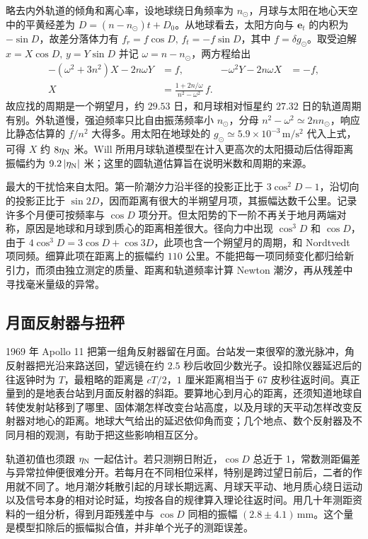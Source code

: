 略去内外轨道的倾角和离心率，设地球绕日角频率为 $n_\odot$，月球与太阳在地心天空中的平黄经差为 $D=(n-n_\odot)t+D_0$。从地球看去，太阳方向与 $\bm e_t$ 的内积为 $-\sin D$，故差分落体力有 $f_r=f\cos D,\,f_t=-f\sin D$，其中 $f=\delta g_\odot$。取受迫解 $x=X\cos D,\,y=Y\sin D$ 并记 $\omega=n-n_\odot$，两方程给出
\begin{align*}
    - (\omega^2+3n^2)X-2n\omega Y&=f,&
    -\omega^2Y-2n\omega X&=-f,\\
    X&=\frac{1+2n/\omega}{n^2-\omega^2}\,f .
\end{align*}
故应找的周期是一个朔望月，约 $29.53$ 日，和月球相对恒星约 $27.32$ 日的轨道周期有别。外轨道慢，强迫频率只比自由振荡频率小 $n_\odot$，分母 $n^2-\omega^2\simeq2nn_\odot$，响应比静态估算的 $f/n^2$ 大得多。用太阳在地球处的 $g_\odot\simeq5.9\times10^{-3}\,\mathrm{m/s^2}$ 代入上式，可得 $X$ 约 $8\eta_{\rm N}$ 米。Will 所用月球轨道模型在计入更高次的太阳摄动后估得距离振幅约为 $9.2\,|\eta_{\rm N}|$ 米；这里的圆轨道估算旨在说明米数和周期的来源。

最大的干扰恰来自太阳。第一阶潮汐力沿半径的投影正比于 $3\cos^2D-1$，沿切向的投影正比于 $\sin 2D$，因而距离有很大的半朔望月项，其振幅达数千公里。记录许多个月便可按频率与 $\cos D$ 项分开。但太阳势的下一阶不再关于地月两端对称，原因是地球和月球到质心的距离相差很大。径向力中出现 $\cos^3D$ 和 $\cos D$，由于 $4\cos^3D=3\cos D+\cos 3D$，此项也含一个朔望月的周期，和 Nordtvedt 项同频。细算此项在距离上的振幅约 $110$ 公里。不能把每一项同频变化都归给新引力，而须由独立测定的质量、距离和轨道频率计算 Newton 潮汐，再从残差中寻找毫米量级的异常。

\subsection{月面反射器与扭秤}

1969 年 Apollo 11 把第一组角反射器留在月面。台站发一束很窄的激光脉冲，角反射器把光沿来路送回，望远镜在约 $2.5$ 秒后收回少数光子。设扣除仪器延迟后的往返钟时为 $T$，最粗略的距离是 $cT/2$，$1$ 厘米距离相当于 $67$ 皮秒往返时间。真正量到的是地表台站到月面反射器的斜距。要算地心到月心的距离，还须知道地球自转使发射站移到了哪里、固体潮怎样改变台站高度，以及月球的天平动怎样改变反射器对地心的距离。地球大气给出的延迟依仰角而变；几个地点、数个反射器及不同月相的观测，有助于把这些影响相互区分。

轨道初值也须跟 $\eta_{\rm N}$ 一起估计。若只测朔日附近，$\cos D$ 总近于 1，常数测距偏差与异常拉伸便很难分开。若每月在不同相位采样，特别是跨过望日前后，二者的作用就不同了。地月潮汐耗散引起的月球长期远离、月球天平动、地月质心绕日运动以及信号本身的相对论时延，均按各自的规律算入理论往返时间。用几十年测距资料的一组分析，得到月距残差中与 $\cos D$ 同相的振幅 $(2.8\pm4.1)\,\mathrm{mm}$。这个量是模型扣除后的振幅拟合值，并非单个光子的测距误差。

